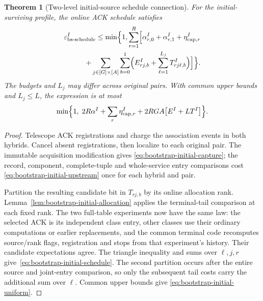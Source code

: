 \documentclass[pdflatex]{sn-jnl}
\theoremstyle{thmstyleone}
\newtheorem{theorem}{Theorem}[section]
\theoremstyle{thmstylethree}
\theoremstyle{thmstyletwo}
\begin{document}
\begin{theorem}[Two-level initial-source schedule connection]
\label{thm:bootstrap-initial-schedule}
For the initial-surviving profile, the online ACK schedule satisfies
\begin{equation}
 \begin{split}
 \varepsilon^I_{\rm bs\text{-}schedule}\le\min\Bigl\{1,
  \sum_{r=1}^{R}\Bigl[\alpha^I_{r,0}+\alpha^I_{r,1}
       +\eta^I_{{\rm cap},r}\\
 \hspace{10mm}+\sum_{j\in[G]\times[A]}\sum_{b=0}^{1}
        \Bigl(E^I_{rj,b}+\sum_{\ell=1}^{L_j}T^I_{rj\ell,b}\Bigr)
       \Bigr]\Bigr\}.
 \end{split}
 \label{eq:bootstrap-initial-schedule}
\end{equation}
The budgets and $L_j$ may differ across original pairs. With common
upper bounds and $L_j\le L$, the expression is at most
\begin{equation}
 \begin{split}
 \min\Bigl\{1,\;2R\alpha^I+\sum_r\eta^I_{{\rm cap},r}
   +2RGA\bigl[E^I+L T^I\bigr]\Bigr\}.
 \end{split}
 \label{eq:bootstrap-initial-uniform}
\end{equation}
\end{theorem}
\begin{proof}
Telescope ACK registrations and charge the association events in both hybrids.
Cancel absent registrations, then localize to each original pair.
The immutable acquisition modification gives
\eqref{eq:bootstrap-initial-capture}; the record, component,
complete-tuple and whole-service entry comparisons cost
\eqref{eq:bootstrap-initial-upstream} once for each hybrid and pair.

Partition the resulting candidate bit in $T_{rj,b}$ by its online
allocation rank. Lemma~\ref{lem:bootstrap-initial-allocation} applies
the terminal-tail comparison at each fixed rank. The two full-table
experiments now have the same law: the selected ACK is its independent
class entry, other classes use their ordinary computations or earlier
replacements, and the common terminal code recomputes source/rank flags,
registration and stops from that experiment's history. Their candidate
expectations agree. The triangle inequality and sums over $\ell,j,r$
give~\eqref{eq:bootstrap-initial-schedule}. The second partition occurs
after the entire source and joint-entry comparison, so only the subsequent
tail costs carry the additional sum over $\ell$. Common upper bounds give
\eqref{eq:bootstrap-initial-uniform}.
\end{proof}
\end{document}
